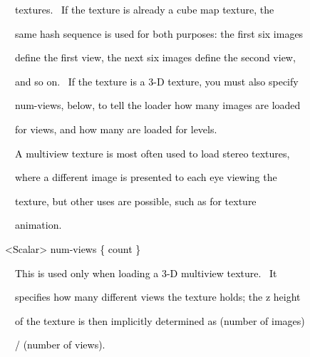 \documentclass[a4paper]{article}
\newcommand\textstyleOOoComputerKeyWord[1]{\textrm{\textcolor[rgb]{0.0,0.0,0.5019608}{#1}}}
\begin{document}
{\color{black}
\textstyleOOoComputerKeyWord{\textcolor{black}{\ \ \ \ textures. \ If the texture is already a cube map texture, the}}}

{\color{black}
\textstyleOOoComputerKeyWord{\textcolor{black}{\ \ \ \ same hash sequence is used for both purposes: the first six
images}}}

{\color{black}
\textstyleOOoComputerKeyWord{\textcolor{black}{\ \ \ \ define the first view, the next six images define the second
view,}}}

{\color{black}
\textstyleOOoComputerKeyWord{\textcolor{black}{\ \ \ \ and so on. \ If the texture is a 3-D texture, you must also
specify}}}

{\color{black}
\textstyleOOoComputerKeyWord{\textcolor{black}{\ \ \ \ num-views, below, to tell the loader how many images are
loaded}}}

{\color{black}
\textstyleOOoComputerKeyWord{\textcolor{black}{\ \ \ \ for views, and how many are loaded for levels.}}}


\bigskip

{\color{black}
\textstyleOOoComputerKeyWord{\textcolor{black}{\ \ \ \ A multiview texture is most often used to load stereo
textures,}}}

{\color{black}
\textstyleOOoComputerKeyWord{\textcolor{black}{\ \ \ \ where a different image is presented to each eye viewing the}}}

{\color{black}
\textstyleOOoComputerKeyWord{\textcolor{black}{\ \ \ \ texture, but other uses are possible, such as for texture}}}

{\color{black}
\textstyleOOoComputerKeyWord{\textcolor{black}{\ \ \ \ animation.}}}


\bigskip

{\color{black}
\textstyleOOoComputerKeyWord{\textcolor{black}{\ \ {\textless}Scalar{\textgreater} num-views \{ count \}}}}


\bigskip

{\color{black}
\textstyleOOoComputerKeyWord{\textcolor{black}{\ \ \ \ This is used only when loading a 3-D multiview texture. \ It}}}

{\color{black}
\textstyleOOoComputerKeyWord{\textcolor{black}{\ \ \ \ specifies how many different views the texture holds; the z
height}}}

{\color{black}
\textstyleOOoComputerKeyWord{\textcolor{black}{\ \ \ \ of the texture is then implicitly determined as (number of
images)}}}

{\color{black}
\textstyleOOoComputerKeyWord{\textcolor{black}{\ \ \ \ / (number of views).}}}
\end{document}
